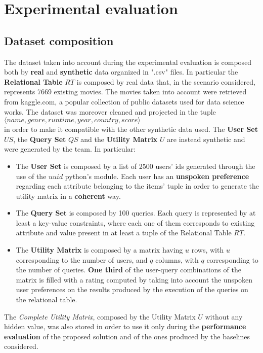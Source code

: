 \section{Experimental evaluation}

\subsection{Dataset composition}
The dataset taken into account during the experimental evaluation is composed both by \textbf{real} and \textbf{synthetic} data organized in ".csv" files. In particular the \textbf{Relational Table} $RT$ is composed by real data that, in the scenario considered, represents 7669 existing movies. The movies taken into account were retrieved from kaggle.com, a popular collection of public datasets used for data science works. The dataset was moreover cleaned and projected in the tuple $\langle name, genre, runtime, year, country, score \rangle$ \\in order to make it compatible with the other synthetic data used.
The \textbf{User Set} $US$, the \textbf{Query Set} $QS$ and the \textbf{Utility Matrix} $U$ are instead synthetic and were generated by the team. In particular:
\begin{itemize}
    \item The \textbf{User Set} is composed by a list of 2500 users' ids generated through the use of the $uuid$ python's module. Each user has an \textbf{unspoken preference} regarding each attribute belonging to the items' tuple in order to generate the utility matrix in a \textbf{coherent} way. 
    \item The \textbf{Query Set} is composed by 100 queries. Each query is represented by at least a key-value constraints, where each one of them corresponds to existing attribute and value present in at least a tuple of the Relational Table $RT$. 
    \item The \textbf{Utility Matrix} is composed by a matrix having $u$ rows, with $u$ corresponding to the number of users, and $q$ columns, with $q$ corresponding to the number of queries. \textbf{One third} of the user-query combinations of the matrix is filled with a rating computed by taking into account the unspoken user preferences on the results produced by the execution of the queries on the relational table.
\end{itemize}
The \textit{Complete Utility Matrix}, composed by the Utility Matrix $U$ without any hidden value, was also stored in order to use it only during the \textbf{performance evaluation} of the proposed solution and of the ones produced by the baselines considered.

